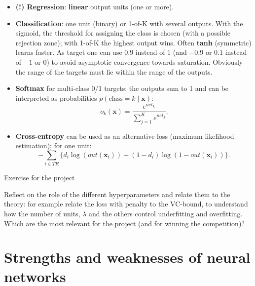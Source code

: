 \begin{itemize}
\tightlist
\item
  \textbf{(!) Regression}: \textbf{linear} output units (one or more).
\item
  \textbf{Classification}: one unit (binary) or 1-of-K with several
  outputs. With the sigmoid, the threshold for assigning the class is
  chosen (with a possible rejection zone); with 1-of-K the highest
  output wins. Often \textbf{tanh} (symmetric) learns faster. As target
  one can use \(0.9\) instead of 1 (and \(-0.9\) or \(0.1\) instead of
  \(-1\) or \(0\)) to avoid asymptotic convergence towards saturation.
  Obviously the range of the targets must lie within the range of the
  outputs.
\item
  \textbf{Softmax} for multi-class 0/1 targets: the outputs sum to 1
  and can be interpreted as probabilities
  \(p(\text{class} = k \mid \mathbf{x})\): \[
  o_k(\mathbf{x}) = \frac{e^{net_k}}{\sum_{j=1}^{K} e^{net_j}}.
  \]
\item
  \textbf{Cross-entropy} can be used as an alternative loss (maximum
  likelihood estimation); for one unit: \[
  -\sum_{i \in TR}\big\{d_i\log(out(\mathbf{x}_i)) + (1 - d_i)\log(1 - out(\mathbf{x}_i))\big\}.
  \]
\end{itemize}

\begin{boxquestion}{Exercise for the project}

Reflect on the role of the different hyperparameters and relate them to
the theory: for example relate the loss with penalty to the VC-bound,
to understand how the number of units, \(\lambda\) and the others
control underfitting and overfitting. Which are the most relevant for
the project (and for winning the competition)?

\end{boxquestion}

\section{Strengths and weaknesses of neural
networks}\label{pregi-e-difetti-delle-reti-neurali}

